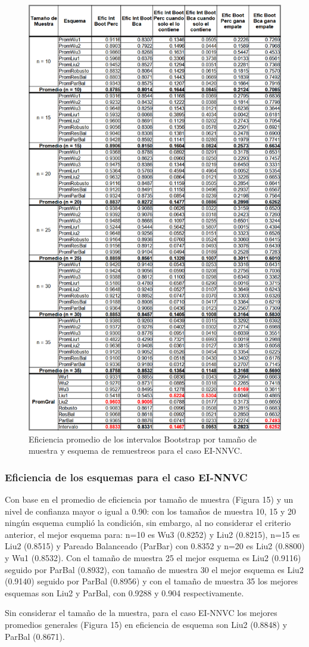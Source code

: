 \begin{figure}[ht] 
	\centering 
	\includegraphics[width=0.55\linewidth]{img/EI_NNVC_Efic_Boots.png} 
	\caption{Eficiencia promedio de los intervalos Bootstrap por tamaño de muestra y esquema de remuestreos para el caso EI-NNVC.} 
	\label{fig:EI_NNVC_Boots}
\end{figure}
\FloatBarrier

\subsubsection{Eficiencia de los esquemas para el caso EI-NNVC}
Con base en el promedio de eficiencia por tamaño de muestra (Figura 15) y un nivel de confianza mayor o igual a 0.90: con los tamaños de muestra 10, 15 y 20 ningún esquema cumplió la condición, sin embargo, al no considerar el criterio anterior, el mejor esquema para: n=10 es Wu3 (0.8252) y Liu2 (0.8215), n=15 es Liu2 (0.8515) y Pareado Balanceado (ParBar) con 0.8352 y n=20 es Liu2 (0.8800) y Wu1 (0.8532). Con el tamaño de muestra 25 el mejor esquema es Liu2 (0.9116) seguido por ParBal (0.8932), con tamaño de muestra 30 el mejor esquema es Liu2 (0.9140) seguido por ParBal (0.8956) y con el tamaño de muestra 35 los mejores esquemas son Liu2 y ParBal, con 0.9288 y 0.904 respectivamente.
\vspace{.5cm}

Sin considerar el tamaño de la muestra, para el caso EI-NNVC los mejores promedios generales (Figura 15) en eficiencia de esquema son Liu2 (0.8848) y ParBal (0.8671).


